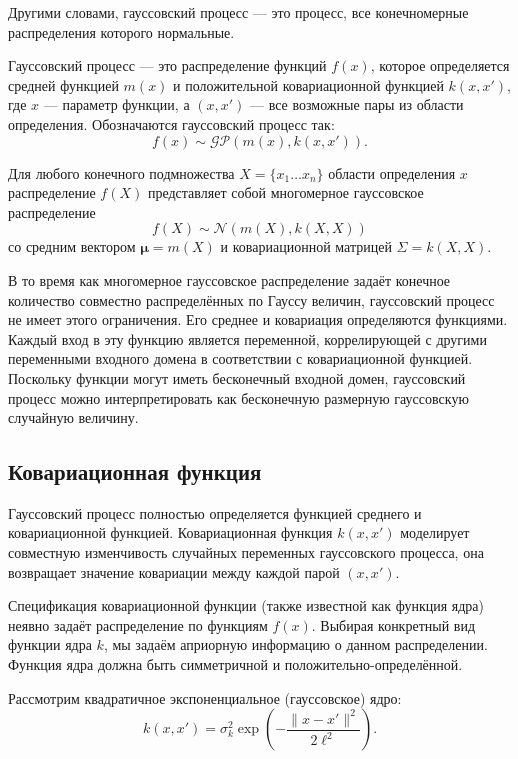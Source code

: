 \documentclass[11pt,a4paper]{article}
\begin{document}
Другими словами, гауссовский процесс --- это процесс, все конечномерные
распределения которого нормальные.

Гауссовский процесс --- это распределение функций \(f(x)\), которое
определяется средней функцией \(m(x)\) и положительной ковариационной
функцией \(k(x,x')\), где \(x\) --- параметр функции, а \((x,x')\) ---
все возможные пары из области определения. Обозначаются гауссовский
процесс так: \[
  f(x) \sim \mathcal{GP}(m(x), k(x,x')).
\]

    Для любого конечного подмножества \(X=\{x_1 \ldots x_n \}\) области
определения \(x\) распределение \(f(X)\) представляет собой многомерное
гауссовское распределение \[
  f(X) \sim \mathcal{N}(m(X), k(X, X))
\] со средним вектором \(\mathbf{\mu} = m(X)\) и ковариационной матрицей
\(\Sigma = k(X, X)\).

В то время как многомерное гауссовское распределение задаёт конечное
количество совместно распределённых по Гауссу величин, гауссовский
процесс не имеет этого ограничения. Его среднее и ковариация
определяются функциями. Каждый вход в эту функцию является переменной,
коррелирующей с другими переменными входного домена в соответствии с
ковариационной функцией. Поскольку функции могут иметь бесконечный
входной домен, гауссовский процесс можно интерпретировать как
бесконечную размерную гауссовскую случайную величину.

    \hypertarget{ux43aux43eux432ux430ux440ux438ux430ux446ux438ux43eux43dux43dux430ux44f-ux444ux443ux43dux43aux446ux438ux44f}{%
\subsection{Ковариационная
функция}\label{ux43aux43eux432ux430ux440ux438ux430ux446ux438ux43eux43dux43dux430ux44f-ux444ux443ux43dux43aux446ux438ux44f}}

Гауссовский процесс полностью определяется функцией среднего и
ковариационной функцией. Ковариационная функция \(k(x, x')\) моделирует
совместную изменчивость случайных переменных гауссовского процесса, она
возвращает значение ковариации между каждой парой \((x, x')\).

Спецификация ковариационной функции (также известной как функция ядра)
неявно задаёт распределение по функциям \(f(x)\). Выбирая конкретный вид
функции ядра \(k\), мы задаём априорную информацию о данном
распределении. Функция ядра должна быть симметричной и
положительно-определённой.

    Рассмотрим квадратичное экспоненциальное (гауссовское) ядро: \[
  k(x, x') = \sigma_k^2 \exp{ \left( -\frac{\lVert x - x' \rVert^2}{{2\ell^2}} \right) }.
\]
\end{document}

